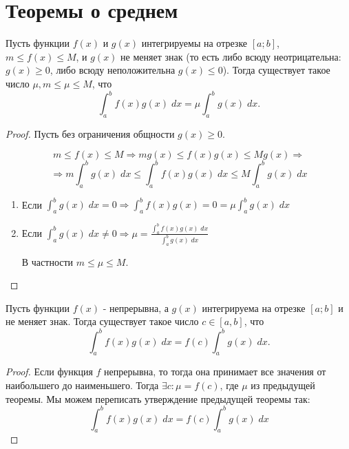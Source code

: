     \section{Теоремы о среднем}
    
    \begin{theorem}
    	Пусть функции $f(x)$ и $g(x)$ интегрируемы на отрезке $[a; b]$,
    	$m \leqslant f(x) \leqslant M$, и $g(x)$ не меняет знак (то есть либо всюду неотрицательна: $g(x) \geqslant 0$, либо всюду неположительна $g(x) \leqslant 0$). Тогда существует такое число $\mu, m \leqslant \mu \leqslant M$, что
    	\[ \int_a^b f(x)g(x) \; dx = \mu \int_a^b g(x) \; dx. \]
    \end{theorem}
    
    \begin{proof}
    	Пусть без ограничения общности $g(x) \geqslant 0$.
    	
    	\[ m \leqslant f(x)\leqslant M \Rightarrow m g(x) \leqslant f(x) g(x) \leqslant M g(x) \Rightarrow \]
    	\[ \Rightarrow m \int_a^b g(x) \; dx \leqslant \int_a^b f(x) g(x) \; dx \leqslant M \int_a^b g(x) \; dx \]
    	
    	\begin{enumerate}
    		\item Если $\int_a^b g(x) \; dx = 0 \Rightarrow \int_a^b f(x)g(x) = 0 = \mu \int_a^b g(x) \; dx$
    		\item Если $\int_a^b g(x) \; dx \neq 0 \Rightarrow \mu = \frac{\int_a^b f(x)g(x) \; dx}{\int_a^b g(x) \; dx}$
    		
    		В частности $m \leqslant \mu \leqslant M$.
    	\end{enumerate}
    \end{proof}
    
    \begin{corollary}
    	Пусть функции $f(x)$ - непрерывна, а $g(x)$ интегрируема на отрезке $[a; b]$ и не меняет знак. Тогда существует такое число
    	$c \in [a, b]$, что
    	\[ \int_a^b f(x)g(x) \; dx = f(c) \int_a^b g(x) \; dx. \]
    \end{corollary}
    
    \begin{proof}
    	Если функция $f$ непрерывна, то тогда она принимает все значения от наибольшего до наименьшего. Тогда $\exists c: \mu = f(c)$, где $\mu$ из предыдущей теоремы. Мы можем переписать утверждение предыдущей теоремы так:
    	\[ \int_a^b f(x)g(x) \; dx = f(c) \int_a^b g(x) \; dx \]
    \end{proof}
    
